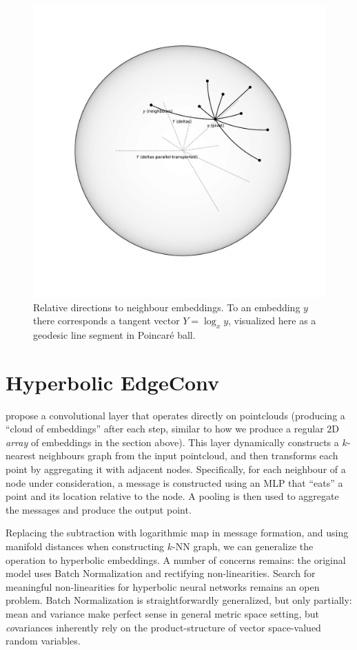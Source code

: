 \begin{figure}[ht]\center
\includegraphics[width=.5\textwidth]{art/neighbours.pdf}
\caption{Relative directions to neighbour embeddings. To an embedding \( y \)
there corresponds a tangent vector \( Y = \log_x y \), visualized here as a
geodesic line segment in Poincar\'e ball.}
\end{figure}

\section{Hyperbolic EdgeConv} \label{sec:hedgeconv}

\citet{edgeconv} propose a convolutional layer that operates directly on
pointclouds (producing a ``cloud of embeddings'' after each step, similar to
how we produce a regular \( 2 \)D \emph{array} of embeddings in the section
above). This layer dynamically constructs a \( k \)-nearest neighbours graph
from the input pointcloud, and then transforms each point by aggregating it
with adjacent nodes. Specifically, for each neighbour of a node under
consideration, a message is constructed using an MLP that ``eats'' a point and its
location relative to the node. A pooling is then used to aggregate the messages
and produce the output point.

Replacing the subtraction with logarithmic map in message formation, and using
manifold distances when constructing \( k \)-NN graph, we can generalize the
operation to hyperbolic embeddings. A number of concerns remains: the original
model uses Batch Normalization and rectifying non-linearities. Search for
meaningful non-linearities for hyperbolic neural networks remains an open
problem. Batch Normalization is straightforwardly generalized, but only
partially: mean and variance make perfect sense in general metric space
setting, but \emph{co}variances inherently rely on the product-structure of
vector space-valued random variables.

